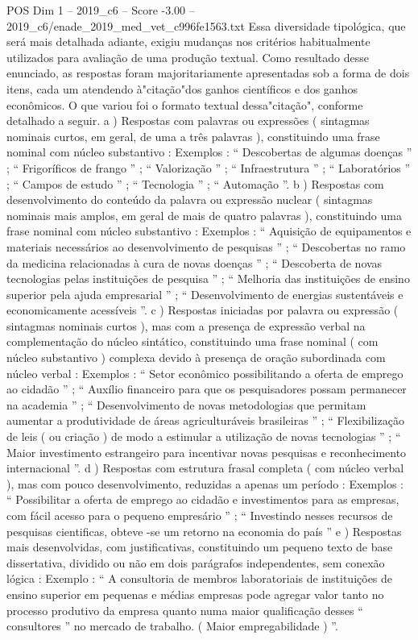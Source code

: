 \begin{textsample}{POS Dim 1 – 2019\_c6 – Score -3.00 – 2019\_c6/enade\_2019\_med\_vet\_c996fe1563.txt}
Essa diversidade tipológica, que será mais detalhada adiante, exigiu mudanças nos critérios habitualmente utilizados para avaliação de uma produção textual.
Como resultado desse enunciado, as respostas foram majoritariamente apresentadas sob a forma de dois itens, cada um atendendo à"citação"dos ganhos científicos e dos ganhos econômicos.
O que variou foi o formato textual dessa"citação", conforme detalhado a seguir. a ) Respostas com palavras ou expressões ( sintagmas nominais curtos, em geral, de uma a três palavras ), constituindo uma frase nominal com núcleo substantivo : Exemplos : “ Descobertas de algumas doenças ” ; “ Frigoríficos de frango ” ; “ Valorização ” ; “ Infraestrutura ” ; “ Laboratórios ” ; “ Campos de estudo ” ; “ Tecnologia ” ; “ Automação ”. b ) Respostas com desenvolvimento do conteúdo da palavra ou expressão nuclear ( sintagmas nominais mais amplos, em geral de mais de quatro palavras ), constituindo uma frase nominal com núcleo substantivo : Exemplos : “ Aquisição de equipamentos e materiais necessários ao desenvolvimento de pesquisas ” ; “ Descobertas no ramo da medicina relacionadas à cura de novas doenças ” ; “ Descoberta de novas tecnologias pelas instituições de pesquisa ” ; “ Melhoria das instituições de ensino superior pela ajuda empresarial ” ; “ Desenvolvimento de energias sustentáveis e economicamente acessíveis ”. c ) Respostas iniciadas por palavra ou expressão ( sintagmas nominais curtos ), mas com a presença de expressão verbal na complementação do núcleo sintático, constituindo uma frase nominal ( com núcleo substantivo ) complexa devido à presença de oração subordinada com núcleo verbal : Exemplos : “ Setor econômico possibilitando a oferta de emprego ao cidadão ” ; “ Auxílio financeiro para que os pesquisadores possam permanecer na academia ” ; “ Desenvolvimento de novas metodologias que permitam aumentar a produtividade de áreas agriculturáveis brasileiras ” ; “ Flexibilização de leis ( ou criação ) de modo a estimular a utilização de novas tecnologias ” ; “ Maior investimento estrangeiro para incentivar novas pesquisas e reconhecimento internacional ”. d ) Respostas com estrutura frasal completa ( com núcleo verbal ), mas com pouco desenvolvimento, reduzidas a apenas um período : Exemplos : “ Possibilitar a oferta de emprego ao cidadão e investimentos para as empresas, com fácil acesso para o pequeno empresário ” ; “ Investindo nesses recursos de pesquisas cientificas, obteve -se um retorno na economia do país ” e ) Respostas mais desenvolvidas, com justificativas, constituindo um pequeno texto de base dissertativa, dividido ou não em dois parágrafos independentes, sem conexão lógica : Exemplo : “ A consultoria de membros laboratoriais de instituições de ensino superior em pequenas e médias empresas pode agregar valor tanto no processo produtivo da empresa quanto numa maior qualificação desses “ consultores ” no mercado de trabalho. ( Maior empregabilidade ) ”.

\end{textsample}
